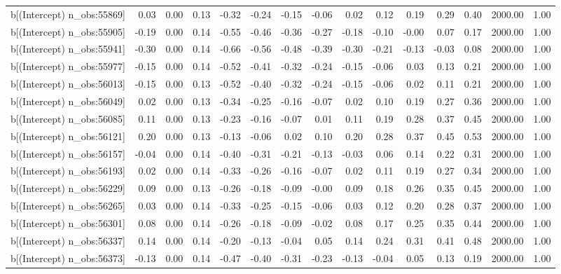 \begin{table}[ht]
\begin{tabular}{rrrrrrrrrrrrrrr}
  b[(Intercept) n\_obs:55869] & 0.03 & 0.00 & 0.13 & -0.32 & -0.24 & -0.15 & -0.06 & 0.02 & 0.12 & 0.19 & 0.29 & 0.40 & 2000.00 & 1.00 \\ 
  b[(Intercept) n\_obs:55905] & -0.19 & 0.00 & 0.14 & -0.55 & -0.46 & -0.36 & -0.27 & -0.18 & -0.10 & -0.00 & 0.07 & 0.17 & 2000.00 & 1.00 \\ 
  b[(Intercept) n\_obs:55941] & -0.30 & 0.00 & 0.14 & -0.66 & -0.56 & -0.48 & -0.39 & -0.30 & -0.21 & -0.13 & -0.03 & 0.08 & 2000.00 & 1.00 \\ 
  b[(Intercept) n\_obs:55977] & -0.15 & 0.00 & 0.14 & -0.52 & -0.41 & -0.32 & -0.24 & -0.15 & -0.06 & 0.03 & 0.13 & 0.21 & 2000.00 & 1.00 \\ 
  b[(Intercept) n\_obs:56013] & -0.15 & 0.00 & 0.13 & -0.52 & -0.40 & -0.32 & -0.24 & -0.15 & -0.06 & 0.02 & 0.11 & 0.21 & 2000.00 & 1.00 \\ 
  b[(Intercept) n\_obs:56049] & 0.02 & 0.00 & 0.13 & -0.34 & -0.25 & -0.16 & -0.07 & 0.02 & 0.10 & 0.19 & 0.27 & 0.36 & 2000.00 & 1.00 \\ 
  b[(Intercept) n\_obs:56085] & 0.11 & 0.00 & 0.13 & -0.23 & -0.16 & -0.07 & 0.01 & 0.11 & 0.19 & 0.28 & 0.37 & 0.45 & 2000.00 & 1.00 \\ 
  b[(Intercept) n\_obs:56121] & 0.20 & 0.00 & 0.13 & -0.13 & -0.06 & 0.02 & 0.10 & 0.20 & 0.28 & 0.37 & 0.45 & 0.53 & 2000.00 & 1.00 \\ 
  b[(Intercept) n\_obs:56157] & -0.04 & 0.00 & 0.14 & -0.40 & -0.31 & -0.21 & -0.13 & -0.03 & 0.06 & 0.14 & 0.22 & 0.31 & 2000.00 & 1.00 \\ 
  b[(Intercept) n\_obs:56193] & 0.02 & 0.00 & 0.14 & -0.33 & -0.26 & -0.16 & -0.07 & 0.02 & 0.11 & 0.19 & 0.27 & 0.34 & 2000.00 & 1.00 \\ 
  b[(Intercept) n\_obs:56229] & 0.09 & 0.00 & 0.13 & -0.26 & -0.18 & -0.09 & -0.00 & 0.09 & 0.18 & 0.26 & 0.35 & 0.45 & 2000.00 & 1.00 \\ 
  b[(Intercept) n\_obs:56265] & 0.03 & 0.00 & 0.14 & -0.33 & -0.25 & -0.15 & -0.06 & 0.03 & 0.12 & 0.20 & 0.28 & 0.37 & 2000.00 & 1.00 \\ 
  b[(Intercept) n\_obs:56301] & 0.08 & 0.00 & 0.14 & -0.26 & -0.18 & -0.09 & -0.02 & 0.08 & 0.17 & 0.25 & 0.35 & 0.44 & 2000.00 & 1.00 \\ 
  b[(Intercept) n\_obs:56337] & 0.14 & 0.00 & 0.14 & -0.20 & -0.13 & -0.04 & 0.05 & 0.14 & 0.24 & 0.31 & 0.41 & 0.48 & 2000.00 & 1.00 \\ 
  b[(Intercept) n\_obs:56373] & -0.13 & 0.00 & 0.14 & -0.47 & -0.40 & -0.31 & -0.23 & -0.13 & -0.04 & 0.05 & 0.13 & 0.19 & 2000.00 & 1.00 \\ 

\end{tabular}
\end{table}
